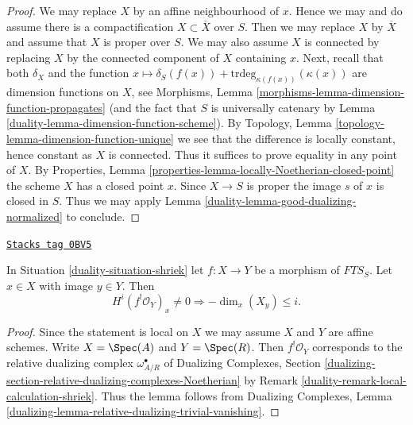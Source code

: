 \begin{proof}

We may replace $X$ by an affine neighbourhood of $x$. Hence we may
and do assume there is a compactification $X \subset \overline{X}$
over $S$. Then we may replace $X$ by $\overline{X}$ and assume
that $X$ is proper over $S$. We may also assume $X$ is connected
by replacing $X$ by the connected component of $X$ containing $x$.
Next, recall that both $\delta_X$ and the function
$x \mapsto \delta_S(f(x)) + \text{trdeg}_{\kappa(f(x))}(\kappa(x))$
are dimension functions on $X$, see
Morphisms, Lemma \ref{morphisms-lemma-dimension-function-propagates}
(and the fact that $S$ is universally catenary by
Lemma \ref{duality-lemma-dimension-function-scheme}).
By Topology, Lemma \ref{topology-lemma-dimension-function-unique}
we see that the difference is locally constant, hence constant as $X$ is
connected. Thus it suffices to prove equality in any point of $X$.
By Properties, Lemma \ref{properties-lemma-locally-Noetherian-closed-point}
the scheme $X$ has a closed point $x$. Since $X \to S$ is proper
the image $s$ of $x$ is closed in $S$. Thus we may apply
Lemma \ref{duality-lemma-good-dualizing-normalized} to conclude.
\end{proof}

\begin{lemma}[Shriek]
\label{duality-lemma-shriek}
\href{https://stacks.math.columbia.edu/tag/0BV5}{\texttt{Stacks tag 0BV5}}

In Situation \ref{duality-situation-shriek} let $f : X \to Y$ be a morphism of
$\textit{FTS}_S$. Let $x \in X$ with image $y \in Y$. Then
$$
H^i(f^!\mathcal{O}_Y)_x \not = 0
\Rightarrow - \dim_x(X_y) \leq i.
$$
\end{lemma}

\begin{proof}

Since the statement is local on $X$ we may assume $X$
and $Y$ are affine schemes. Write
$X = \Spec(A)$ and $Y = \Spec(R)$.
Then $f^!\mathcal{O}_Y$ corresponds to the relative dualizing
complex $\omega_{A/R}^\bullet$ of
Dualizing Complexes, Section
\ref{dualizing-section-relative-dualizing-complexes-Noetherian}
by Remark \ref{duality-remark-local-calculation-shriek}.
Thus the lemma follows from Dualizing Complexes, Lemma
\ref{dualizing-lemma-relative-dualizing-trivial-vanishing}.
\end{proof}

